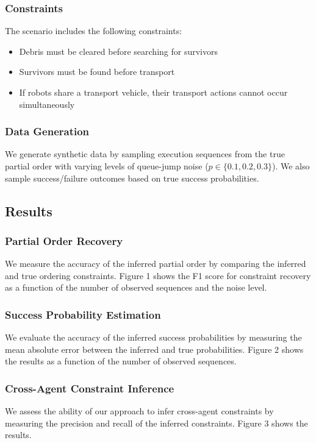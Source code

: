 \documentclass[twocolumn, 10pt]{article}
\begin{document}
\subsubsection{Constraints}
The scenario includes the following constraints:
\begin{itemize}
    \item Debris must be cleared before searching for survivors
    \item Survivors must be found before transport
    \item If robots share a transport vehicle, their transport actions cannot occur simultaneously
\end{itemize}

\subsubsection{Data Generation}
We generate synthetic data by sampling execution sequences from the true partial order with varying levels of queue-jump noise ($p \in \{0.1, 0.2, 0.3\}$). We also sample success/failure outcomes based on true success probabilities.

\subsection{Results}
\subsubsection{Partial Order Recovery}
We measure the accuracy of the inferred partial order by comparing the inferred and true ordering constraints. Figure 1 shows the F1 score for constraint recovery as a function of the number of observed sequences and the noise level.

\subsubsection{Success Probability Estimation}
We evaluate the accuracy of the inferred success probabilities by measuring the mean absolute error between the inferred and true probabilities. Figure 2 shows the results as a function of the number of observed sequences.

\subsubsection{Cross-Agent Constraint Inference}
We assess the ability of our approach to infer cross-agent constraints by measuring the precision and recall of the inferred constraints. Figure 3 shows the results.
\end{document}
